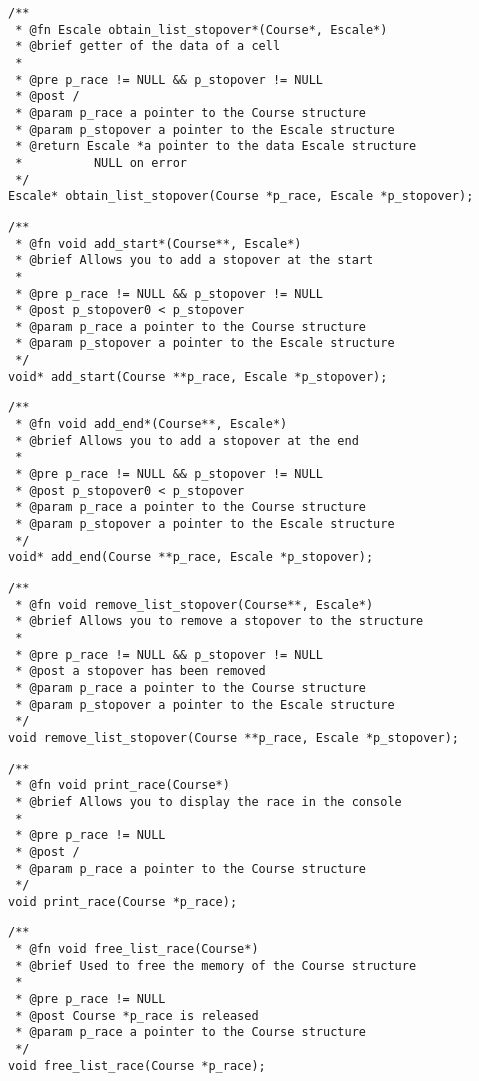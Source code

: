 \documentclass[a4paper, 11pt, oneside]{article}
\begin{document}
		\begin{lstlisting}
/**
 * @fn Escale obtain_list_stopover*(Course*, Escale*)
 * @brief getter of the data of a cell
 *
 * @pre p_race != NULL && p_stopover != NULL
 * @post /
 * @param p_race a pointer to the Course structure
 * @param p_stopover a pointer to the Escale structure
 * @return Escale *a pointer to the data Escale structure
 * 			NULL on error
 */
Escale* obtain_list_stopover(Course *p_race, Escale *p_stopover);
		\end{lstlisting}

		\begin{lstlisting}
/**
 * @fn void add_start*(Course**, Escale*)
 * @brief Allows you to add a stopover at the start
 *
 * @pre p_race != NULL && p_stopover != NULL
 * @post p_stopover0 < p_stopover
 * @param p_race a pointer to the Course structure
 * @param p_stopover a pointer to the Escale structure
 */
void* add_start(Course **p_race, Escale *p_stopover);
		\end{lstlisting}

		\begin{lstlisting}
/**
 * @fn void add_end*(Course**, Escale*)
 * @brief Allows you to add a stopover at the end
 *
 * @pre p_race != NULL && p_stopover != NULL
 * @post p_stopover0 < p_stopover
 * @param p_race a pointer to the Course structure
 * @param p_stopover a pointer to the Escale structure
 */
void* add_end(Course **p_race, Escale *p_stopover);
		\end{lstlisting}

		\begin{lstlisting}
/**
 * @fn void remove_list_stopover(Course**, Escale*)
 * @brief Allows you to remove a stopover to the structure
 *
 * @pre p_race != NULL && p_stopover != NULL
 * @post a stopover has been removed
 * @param p_race a pointer to the Course structure
 * @param p_stopover a pointer to the Escale structure
 */
void remove_list_stopover(Course **p_race, Escale *p_stopover);
		\end{lstlisting}

		\begin{lstlisting}
/**
 * @fn void print_race(Course*)
 * @brief Allows you to display the race in the console
 *
 * @pre p_race != NULL
 * @post /
 * @param p_race a pointer to the Course structure
 */
void print_race(Course *p_race);
		\end{lstlisting}

		\begin{lstlisting}
/**
 * @fn void free_list_race(Course*)
 * @brief Used to free the memory of the Course structure
 *
 * @pre p_race != NULL
 * @post Course *p_race is released
 * @param p_race a pointer to the Course structure
 */
void free_list_race(Course *p_race);
		\end{lstlisting}
\end{document}
